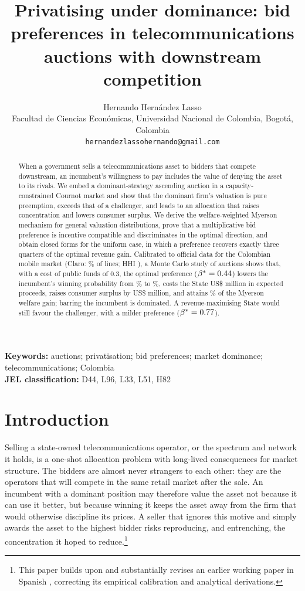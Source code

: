 \documentclass[12pt,a4paper]{article}
\title{Privatising under dominance: bid preferences in telecommunications auctions with downstream competition}
\author{Hernando Hern\'andez Lasso\\[2pt]
\small Facultad de Ciencias Econ\'omicas, Universidad Nacional de Colombia, Bogot\'a, Colombia\\
\small \texttt{hernandezlassohernando@gmail.com}}
\date{}
\theoremstyle{definition}
\theoremstyle{remark}
\newcommand{\us}{US\$}
\begin{document}
\maketitle

\begin{abstract}
\noindent When a government sells a telecommunications asset to bidders that compete downstream, an incumbent's willingness to pay includes the value of denying the asset to its rivals. We embed a dominant-strategy ascending auction in a capacity-constrained Cournot market and show that the dominant firm's valuation is pure preemption, exceeds that of a challenger, and leads to an allocation that raises concentration and lowers consumer surplus. We derive the welfare-weighted Myerson mechanism for general valuation distributions, prove that a multiplicative bid preference is incentive compatible and discriminates in the optimal direction, and obtain closed forms for the uniform case, in which a preference recovers exactly three quarters of the optimal revenue gain. Calibrated to official data for the Colombian mobile market (Claro: \claroShare\% of lines; HHI \hhiMobile), a Monte Carlo study of \nEval{} auctions shows that, with a cost of public funds of 0.3, the optimal preference ($\beta^*=0.44$) lowers the incumbent's winning probability from \pDStd\% to \pDPref\%, costs the State \us\netDropPref{} million in expected proceeds, raises consumer surplus by \us\csGainPrefVsStd{} million, and attains \shareMyerson\% of the Myerson welfare gain; barring the incumbent is dominated. A revenue-maximising State would still favour the challenger, with a milder preference ($\beta^*=0.77$).
\end{abstract}

\medskip
\noindent\textbf{Keywords:} auctions; privatisation; bid preferences; market dominance; telecommunications; Colombia\\
\textbf{JEL classification:} D44, L96, L33, L51, H82

\onehalfspacing

\section{Introduction}\label{sec:intro}

Selling a state-owned telecommunications operator, or the spectrum and network it holds, is a one-shot allocation problem with long-lived consequences for market structure. The bidders are almost never strangers to each other: they are the operators that will compete in the same retail market after the sale. An incumbent with a dominant position may therefore value the asset not because it can use it better, but because winning it keeps the asset away from the firm that would otherwise discipline its prices. A seller that ignores this motive and simply awards the asset to the highest bidder risks reproducing, and entrenching, the concentration it hoped to reduce.\footnote{This paper builds upon and substantially revises an earlier working paper in Spanish \citep{hernandez2021}, correcting its empirical calibration and analytical derivations.}
\end{document}
